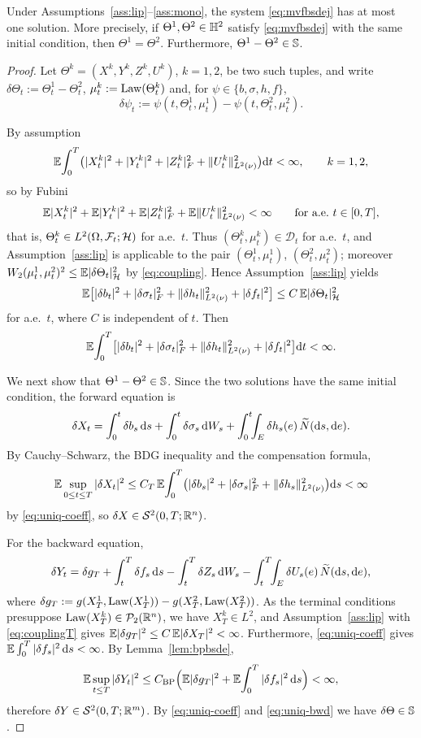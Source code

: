 \begin{theorem}[Uniqueness]\label{thm:uniq}
Under Assumptions~\ref{ass:lip}--\ref{ass:mono}, the system \eqref{eq:mvfbsdej} has at
most one solution. More precisely, if $\Theta^1,\Theta^2\in\mathbb{H}^2$ satisfy
\eqref{eq:mvfbsdej} with the same initial condition, then $\Theta^1=\Theta^2$. Furthermore,
$\Theta^1-\Theta^2\in\mathbb{S}$.
\end{theorem}
\begin{proof}
Let $\Theta^k=(X^k,Y^k,Z^k,U^k)$, $k=1,2$, be two such tuples, and write
$\delta\Theta_t:=\Theta^1_t-\Theta^2_t$, $\mu^k_t:=\mathrm{Law}(\Theta^k_t)$ and, for
$\psi\in\{b,\sigma,h,f\}$,
\[
\delta\psi_t:=\psi(t,\Theta^1_t,\mu^1_t)-\psi(t,\Theta^2_t,\mu^2_t).
\]

By assumption
\[
\mathbb{E}\!\int_0^T\!\big(|X^k_t|^2+|Y^k_t|^2+|Z^k_t|_F^2+\lVert U^k_t\rVert_{L^2(\nu)}^2\big)\mathrm{d} t<\infty,
\qquad k=1,2,
\]
so by Fubini
\[
\mathbb{E}|X^k_t|^2+\mathbb{E}|Y^k_t|^2+\mathbb{E}|Z^k_t|_F^2+\mathbb{E}\lVert U^k_t\rVert_{L^2(\nu)}^2<\infty
\qquad\text{for a.e.\ }t\in[0,T],
\]
that is, $\Theta^k_t\in L^2(\Omega,\mathcal{F}_t;\mathcal H)$ for a.e.\ $t$. Thus
$(\Theta^k_t,\mu^k_t)\in\mathcal D_t$ for a.e.\ $t$, and Assumption~\ref{ass:lip} is
applicable to the pair $(\Theta^1_t,\mu^1_t)$, $(\Theta^2_t,\mu^2_t)$; moreover
$W_2(\mu^1_t,\mu^2_t)^2\le\mathbb{E}|\delta\Theta_t|_{\mathcal H}^2$ by \eqref{eq:coupling}.
Hence Assumption~\ref{ass:lip} yields
\[
\mathbb{E}\big[|\delta b_t|^2+|\delta\sigma_t|_F^2+\lVert \delta h_t\rVert_{L^2(\nu)}^2+|\delta f_t|^2\big]
\le C\,\mathbb{E}|\delta\Theta_t|_{\mathcal H}^2
\]
for a.e.\ $t$, where $C$ is independent of $t$. Then
\begin{equation}\label{eq:uniq-coeff}
\mathbb{E}\!\int_0^T\!\big[|\delta b_t|^2+|\delta\sigma_t|_F^2+\lVert \delta h_t\rVert_{L^2(\nu)}^2
+|\delta f_t|^2\big]\mathrm{d} t<\infty .
\end{equation}

We next show that $\Theta^1-\Theta^2\in\mathbb{S}$. Since the two solutions have the same
initial condition, the forward equation is
\[
\delta X_t=\int_0^t\delta b_s\,\mathrm{d} s+\int_0^t\delta\sigma_s\,\mathrm{d} W_s
+\int_0^t\!\!\int_E\delta h_s(e)\,\widetilde{N}(\mathrm{d} s,\mathrm{d} e).
\]
By Cauchy--Schwarz, the BDG inequality and the compensation formula,
\[
\mathbb{E}\sup_{0\le t\le T}|\delta X_t|^2
\le C_T\,\mathbb{E}\!\int_0^T\!\big(|\delta b_s|^2+|\delta\sigma_s|_F^2
+\lVert \delta h_s\rVert_{L^2(\nu)}^2\big)\mathrm{d} s<\infty
\]
by \eqref{eq:uniq-coeff}, so $\delta X\in\mathcal{S}^2(0,T;\mathbb{R}^n)$.

For the backward equation,
\[
\delta Y_t=\delta g_T+\int_t^T\delta f_s\,\mathrm{d} s-\int_t^T\delta Z_s\,\mathrm{d} W_s
-\int_t^T\!\!\int_E\delta U_s(e)\,\widetilde{N}(\mathrm{d} s,\mathrm{d} e),
\]
where $\delta g_T:=g(X^1_T,\mathrm{Law}(X^1_T))-g(X^2_T,\mathrm{Law}(X^2_T))$. As the terminal
conditions presuppose $\mathrm{Law}(X^k_T)\in\mathcal P_2(\mathbb{R}^n)$, we have $X^k_T\in L^2$, and
Assumption~\ref{ass:lip} with \eqref{eq:couplingT} gives
$\mathbb{E}|\delta g_T|^2\le C\,\mathbb{E}|\delta X_T|^2<\infty$. Furthermore, \eqref{eq:uniq-coeff}
gives $\mathbb{E}\int_0^T|\delta f_s|^2\,\mathrm{d} s<\infty$. By Lemma~\ref{lem:bpbsde},
\begin{equation}\label{eq:uniq-bwd}
\mathbb{E}\sup_{t\le T}|\delta Y_t|^2
\le C_{\mathrm{BP}}\Big(\mathbb{E}|\delta g_T|^2+\mathbb{E}\!\int_0^T|\delta f_s|^2\,\mathrm{d} s\Big)
<\infty ,
\end{equation}
therefore $\delta Y\in\mathcal{S}^2(0,T;\mathbb{R}^m)$. By \eqref{eq:uniq-coeff} and \eqref{eq:uniq-bwd} we
have $\delta\Theta\in\mathbb{S}$.


\end{proof}
